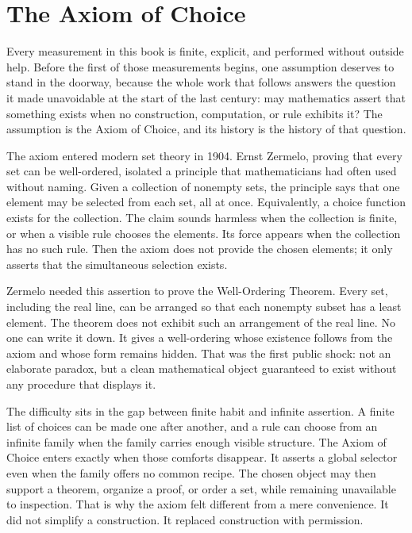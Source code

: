 \chapter*{The Axiom of Choice}

Every measurement in this book is finite, explicit, and performed without
outside help. Before the first of those measurements begins, one assumption
deserves to stand in the doorway, because the whole work that follows answers
the question it made unavoidable at the start of the last century: may
mathematics assert that something exists when no construction, computation, or
rule exhibits it? The assumption is the Axiom of Choice, and its history is
the history of that question.

The axiom entered modern set theory in 1904. Ernst Zermelo, proving that every
set can be well-ordered, isolated a principle that mathematicians had often
used without naming. Given a collection of nonempty sets, the principle says
that one element may be selected from each set, all at once. Equivalently, a
choice function exists for the collection. The claim sounds harmless when the
collection is finite, or when a visible rule chooses the elements. Its force
appears when the collection has no such rule. Then the axiom does not provide
the chosen elements; it only asserts that the simultaneous selection exists.

Zermelo needed this assertion to prove the Well-Ordering Theorem. Every set,
including the real line, can be arranged so that each nonempty subset has a
least element. The theorem does not exhibit such an arrangement of the real
line. No one can write it down. It gives a well-ordering whose existence follows
from the axiom and whose form remains hidden. That was the first public shock:
not an elaborate paradox, but a clean mathematical object guaranteed to exist
without any procedure that displays it.

The difficulty sits in the gap between finite habit and infinite assertion. A
finite list of choices can be made one after another, and a rule can choose
from an infinite family when the family carries enough visible structure. The
Axiom of Choice enters exactly when those comforts disappear. It asserts a
global selector even when the family offers no common recipe. The chosen object
may then support a theorem, organize a proof, or order a set, while remaining
unavailable to inspection. That is why the axiom felt different from a mere
convenience. It did not simplify a construction. It replaced construction with
permission.

